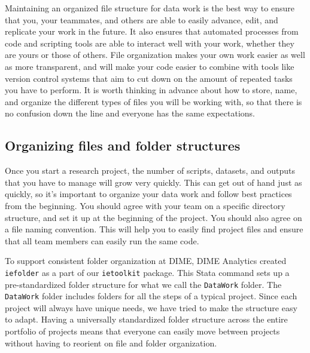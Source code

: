 Maintaining an organized file structure for data work is the best way
to ensure that you, your teammates, and others
are able to easily advance, edit, and replicate your work in the future.
It also ensures that automated processes from code and scripting tools
are able to interact well with your work,
whether they are yours or those of others.
File organization makes your own work easier as well as more transparent,
and will make your code easier to combine with tools like version control systems
that aim to cut down on the amount of repeated tasks you have to perform.
It is worth thinking in advance about how to store, name, and organize
the different types of files you will be working with,
so that there is no confusion down the line
and everyone has the same expectations.

\subsection{Organizing files and folder structures}

Once you start a research project,
the number of scripts, datasets, and outputs that you have to manage will grow very quickly.
This can get out of hand just as quickly,
so it's important to organize your data work and follow best practices from the beginning.
You should agree with your team on a specific directory structure,
and set it up at the beginning of the project.
You should also agree on a file naming convention.
This will help you to easily find project files and 
ensure that all team members can easily run the same code. 

To support consistent folder organization at DIME, 
DIME Analytics created \texttt{iefolder}
as a part of our \texttt{ietoolkit} package.
This Stata command sets up a pre-standardized folder structure
for what we call the \texttt{DataWork} folder.
The \texttt{DataWork} folder includes folders for all the steps of a typical project.
Since each project will always have unique needs,
we have tried to make the structure easy to adapt.
Having a universally standardized folder structure 
across the entire portfolio of projects
means that everyone can easily move between projects 
without having to reorient on file and folder organization.


